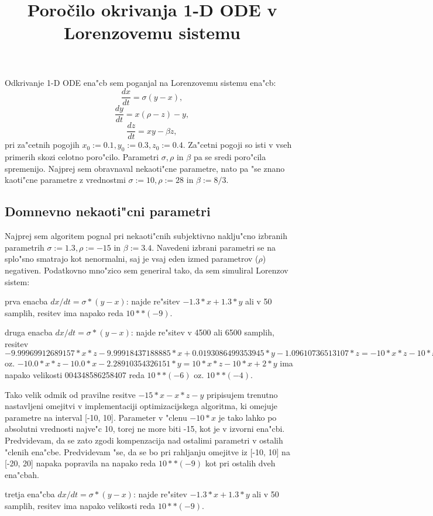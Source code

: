 \documentclass[10pt,a4paper]{article}
\title{Poročilo okrivanja 1-D ODE v Lorenzovemu sistemu}
\begin{document}
	\maketitle
    
Odkrivanje 1-D ODE ena"cb sem poganjal na Lorenzovemu sistemu ena"cb:
$$
\frac{dx}{dt} = \sigma (y-x),
$$ $$
\frac{dy}{dt} = x(\rho-z) - y,
$$ $$
\frac{dz}{dt} = xy - \beta z,
$$
pri za"cetnih pogojih $x_0:=0.1, y_0:=0.3, z_0:=0.4$.
Za"cetni pogoji so isti v vseh primerih skozi celotno poro"cilo.
Parametri $\sigma, \rho$ in $\beta$ pa se sredi poro"cila
spremenijo. Najprej sem obravnaval nekaoti"cne parametre, nato 
pa "se znano kaoti"cne parametre z vrednostmi
$\sigma:=10, \rho:=28$ in $\beta:=8/3$.

\subsection{Domnevno nekaoti"cni parametri}
Najprej sem algoritem pognal pri nekaoti"cnih subjektivno naklju"cno izbranih parametrih
$\sigma:=1.3, \rho:=-15$ in $\beta:=3.4$.
Navedeni izbrani parametri se na splo"sno smatrajo kot nenormalni, saj je vsaj eden izmed parametrov
($\rho$) negativen.
Podatkovno mno"zico sem generiral tako, da sem simuliral Lorenzov sistem:

prva enacba  $dx/dt = \sigma*(y-x)$: najde re"sitev 
$ -1.3*x + 1.3*y$ ali 
v 50 samplih, resitev ima napako reda $10**(-9)$.


druga enacba  $dx/dt = \sigma*(y-x)$: najde re"sitev v 4500 ali 6500 samplih, resitev 
$-9.99969912689157*x*z - 9.99918437188885*x + 0.0193086499353945*y - 1.09610736513107*z = -10*x*z -10*x +0.02*y -z $ oz. $-10.0*x*z - 10.0*x - 2.28910354326151*y = 10*x*z -10*x +2*y$ ima napako
velikosti
004348586258407
reda $10**(-6)$ oz. $10**(-4)$. 

Tako velik odmik od pravilne resitve  
$-15*x-x*z-y$ pripisujem trenutno nastavljeni omejitvi v implementaciji optimizacijskega
algoritma, ki omejuje parametre na interval [-10, 10]. Parameter v "clenu $-10*x$ je tako
lahko po absolutni vrednosti najve"c 10, torej ne more biti -15, kot je v izvorni ena"cbi.
Predvidevam, da se zato zgodi kompenzacija nad ostalimi parametri v ostalih "clenih ena"cbe.
Predvidevam "se, da se bo pri rahljanju omejitve iz [-10, 10] na [-20, 20] napaka popravila
na napako reda $10**(-9)$ kot pri ostalih dveh ena"cbah.

tretja ena"cba  $dx/dt = \sigma*(y-x)$: najde re"sitev 
$ -1.3*x + 1.3*y$ ali 
v 50 samplih, resitev ima napako velikosti
reda $10**(-9)$.
\end{document}
